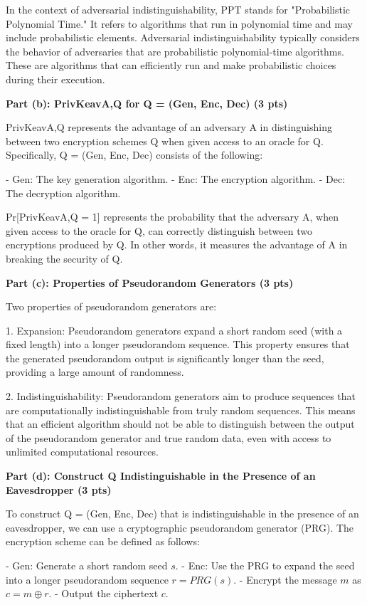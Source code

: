 \documentclass{article}
\begin{document}
In the context of adversarial indistinguishability, PPT stands for "Probabilistic Polynomial Time." It refers to algorithms that run in polynomial time and may include probabilistic elements. Adversarial indistinguishability typically considers the behavior of adversaries that are probabilistic polynomial-time algorithms. These are algorithms that can efficiently run and make probabilistic choices during their execution.

\textbf{Part (b): PrivKeavA,Q for Q = (Gen, Enc, Dec) (3 pts)}

PrivKeavA,Q represents the advantage of an adversary A in distinguishing between two encryption schemes Q when given access to an oracle for Q. Specifically, Q = (Gen, Enc, Dec) consists of the following:

- Gen: The key generation algorithm.
- Enc: The encryption algorithm.
- Dec: The decryption algorithm.

Pr[PrivKeavA,Q = 1] represents the probability that the adversary A, when given access to the oracle for Q, can correctly distinguish between two encryptions produced by Q. In other words, it measures the advantage of A in breaking the security of Q.

\textbf{Part (c): Properties of Pseudorandom Generators (3 pts)}

Two properties of pseudorandom generators are:

1. Expansion: Pseudorandom generators expand a short random seed (with a fixed length) into a longer pseudorandom sequence. This property ensures that the generated pseudorandom output is significantly longer than the seed, providing a large amount of randomness.

2. Indistinguishability: Pseudorandom generators aim to produce sequences that are computationally indistinguishable from truly random sequences. This means that an efficient algorithm should not be able to distinguish between the output of the pseudorandom generator and true random data, even with access to unlimited computational resources.

\textbf{Part (d): Construct Q Indistinguishable in the Presence of an Eavesdropper (3 pts)}

To construct Q = (Gen, Enc, Dec) that is indistinguishable in the presence of an eavesdropper, we can use a cryptographic pseudorandom generator (PRG). The encryption scheme can be defined as follows:

- Gen: Generate a short random seed $s$.
- Enc: Use the PRG to expand the seed into a longer pseudorandom sequence $r = PRG(s)$.
- Encrypt the message $m$ as $c = m \oplus r$.
- Output the ciphertext $c$.
\end{document}
